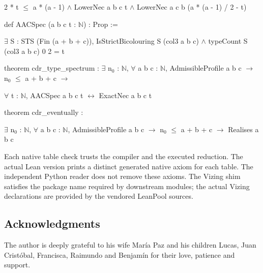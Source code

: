 \documentclass[english,11pt,a4paper]{article}
\begin{document}
\noindent\hspace*{0.9em}2 * t \(\le\) a * (a - 1) \(\land\) LowerNec a b c t \(\land\) LowerNec a c b (a * (a - 1) / 2 - t)\par
\noindent\hspace*{0.0em}\par
\noindent\hspace*{0.0em}def AACSpec (a b c t : \(\mathbb N\)) : Prop :=\par
\noindent\hspace*{0.9em}\(\exists\) S : STS (Fin (a + b + c)), IsStrictBicolouring S (col3 a b c) \(\land\) typeCount S (col3 a b c) 0 2 = t\par
\noindent\hspace*{0.0em}\par
\noindent\hspace*{0.0em}theorem cdr\_\allowbreak{}type\_\allowbreak{}spectrum : \(\exists\) n\(_0\) : \(\mathbb N\), \(\forall\) a b c : \(\mathbb N\), AdmissibleProfile a b c \(\to\) n\(_0\) \(\le\) a + b + c \(\to\)\par
\noindent\hspace*{1.8em}\(\forall\) t : \(\mathbb N\), AACSpec a b c t \(\leftrightarrow\) ExactNec a b c t\par
\noindent\hspace*{0.0em}\par
\noindent\hspace*{0.0em}theorem cdr\_\allowbreak{}eventually :\par
\noindent\hspace*{1.8em}\(\exists\) n\(_0\) : \(\mathbb N\), \(\forall\) a b c : \(\mathbb N\), AdmissibleProfile a b c \(\to\) n\(_0\) \(\le\) a + b + c \(\to\) Realises a b c\par\endgroup

Each native table check trusts the compiler and the executed reduction. The actual Lean version prints a distinct generated native axiom for each table. The independent Python reader does not remove these axioms. The Vizing shim satisfies the package name required by downstream modules; the actual Vizing declarations are provided by the vendored LeanPool sources.

\subsection{Acknowledgments}\label{acknowledgments}

The author is deeply grateful to his wife María Paz and his children Lucas, Juan Cristóbal, Francisca, Raimundo and Benjamín for their love, patience and support.
\end{document}
